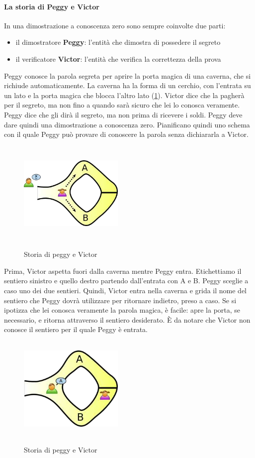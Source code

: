 \paragraph{La storia di Peggy e Victor}
In una dimostrazione a conoscenza zero sono sempre coinvolte due parti:
\begin{itemize}
\item il dimostratore \textbf{Peggy}: l'entità che dimostra di possedere il segreto
\item il verificatore \textbf{Victor}: l'entità che verifica la correttezza della prova
\end{itemize}
Peggy conosce la parola segreta per aprire la porta magica di una caverna, che si richiude automaticamente. La caverna ha la forma di un cerchio, con l'entrata su un lato e la porta magica che blocca l'altro lato (\ref{fig:peggy_victor_1}). Victor dice che la pagherà per il segreto, ma non fino a quando sarà sicuro che lei lo conosca veramente. Peggy dice che gli dirà il segreto, ma non prima di ricevere i soldi. Peggy deve dare quindi una dimostrazione a conoscenza zero. Pianificano quindi uno schema con il quale Peggy può provare di conoscere la parola senza dichiararla a Victor.
\begin{figure}[htbp]
	\centering%
	\subfigure%
	{\includegraphics[height=5cm, width=5cm, keepaspectratio]{Immagini/chiave_pubblica/peggy_victor_1.png}}
	\caption{Storia di peggy e Victor\label{fig:peggy_victor_1}}
\end{figure}
Prima, Victor aspetta fuori dalla caverna mentre Peggy entra. Etichettiamo il sentiero sinistro e quello destro partendo dall'entrata con A e B. Peggy sceglie a caso uno dei due sentieri. Quindi, Victor entra nella caverna e grida il nome del sentiero che Peggy dovrà utilizzare per ritornare indietro, preso a caso. Se si ipotizza che lei conosca veramente
la parola magica, è facile: apre la porta, se necessario, e ritorna attraverso il sentiero desiderato. È da notare che Victor non conosce il sentiero per il quale Peggy è entrata.
\begin{figure}[htbp]
	\centering%
	\subfigure%
	{\includegraphics[height=5cm, width=5cm, keepaspectratio]{Immagini/chiave_pubblica/peggy_victor_2.png}}
	\caption{Storia di peggy e Victor\label{fig:peggy_victor_2}}
\end{figure}
